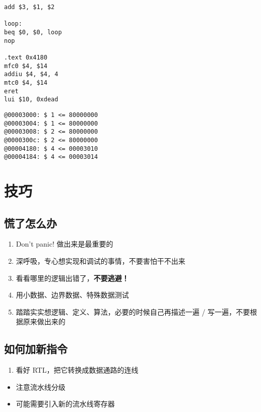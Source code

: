 \documentclass[12pt,AutoFakeBold,AutoFakeSlant]{article}
\providecommand{\tightlist}{%
  \setlength{\itemsep}{0pt}\setlength{\parskip}{0pt}}
\begin{document}
\begin{enumerate}
\begin{lstlisting}[language={[mips]Assembler}]
add $3, $1, $2

loop:
beq $0, $0, loop
nop

.text 0x4180
mfc0 $4, $14
addiu $4, $4, 4
mtc0 $4, $14
eret
lui $10, 0xdead

\end{lstlisting}
\begin{verbatim}
@00003000: $ 1 <= 80000000
@00003004: $ 1 <= 80000000
@00003008: $ 2 <= 80000000
@0000300c: $ 2 <= 80000000
@00004180: $ 4 <= 00003010
@00004184: $ 4 <= 00003014
\end{verbatim}
\end{enumerate}

\hypertarget{ux6280ux5de7}{%
\section{技巧}\label{ux6280ux5de7}}

\hypertarget{ux614cux4e86ux600eux4e48ux529e}{%
\subsection{慌了怎么办}\label{ux614cux4e86ux600eux4e48ux529e}}

\begin{enumerate}
\def\labelenumi{\arabic{enumi}.}
\tightlist
\item
  Don't panic! 做出来是最重要的
\item
  深呼吸，专心想实现和调试的事情，不要害怕干不出来
\item
  看看哪里的逻辑出错了，\textbf{不要逃避！}
\item
  用小数据、边界数据、特殊数据测试
\item
  踏踏实实想逻辑、定义、算法，必要的时候自己再描述一遍 /
  写一遍，不要根据原来做出来的
\end{enumerate}

\hypertarget{ux5982ux4f55ux52a0ux65b0ux6307ux4ee4}{%
\subsection{如何加新指令}\label{ux5982ux4f55ux52a0ux65b0ux6307ux4ee4}}

\begin{enumerate}
\def\labelenumi{\arabic{enumi}.}
\tightlist
\item
  看好 RTL，把它转换成数据通路的连线
\end{enumerate}

\begin{itemize}
\tightlist
\item
  注意流水线分级
\item
  可能需要引入新的流水线寄存器
\end{itemize}
\end{document}
